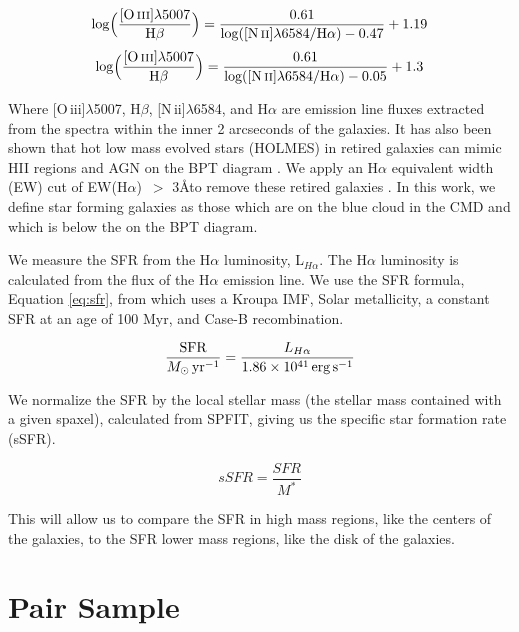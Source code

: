 \documentclass[iop,revtex4,twocolumn,apj,numberedappendix,appendixfloats]{emulateapj}
\newcommand{\OIII}{[O\,{\sc iii}]}
\newcommand{\NII}{[N\,{\sc ii}]}
\newcommand{\angstrom}{\mbox{\normalfont\AA}}
\newcommand{\ewha}{EW(H$\alpha$)}
\begin{document}
\begin{equation}\label{eq:kewley}
\rm{log\Big(\frac{[O\,\textsc{iii}]\lambda 5007}{H\beta}\Big) = \frac{0.61}{log([N\,\textsc{ii}]\lambda 6584 / H\alpha) - 0.47} + 1.19}
\end{equation}
\begin{equation}\label{eq:kauffmann}
\rm{log\Big(\frac{[O\,\textsc{iii}]\lambda 5007}{H\beta}\Big) = \frac{0.61}{log([N\,\textsc{ii}]\lambda 6584 / H\alpha) - 0.05} + 1.3}
\end{equation}

Where \OIII$\lambda$5007, H$\beta$, \NII$\lambda$6584, and H$\alpha$ are emission line fluxes extracted from the spectra within the inner 2 arcseconds of the galaxies. It has also been shown that hot low mass evolved stars (HOLMES) in retired galaxies can mimic HII regions and AGN on the BPT diagram \citep{Stasinska:2008}. We apply an H$\alpha$ equivalent width (EW) cut of \ewha\ $>$ 3\angstrom to remove these retired galaxies \citet{Cid-Fernandes:2011}. In this work, we define star forming galaxies as those which are on the blue cloud in the CMD and which is below the \citet{Kewley:2001} on the BPT diagram.

We measure the SFR from the H$\alpha$ luminosity, L$_{H\alpha}$. The H$\alpha$ luminosity is calculated from the flux of the H$\alpha$ emission line. We use the SFR formula, Equation \ref{eq:sfr}, from \citet{Murphy:2011} which uses a Kroupa IMF, Solar metallicity, a constant SFR at an age of 100 Myr, and Case-B recombination. 

\begin{equation}\label{eq:sfr}
\frac{\rm{SFR}}{M_{\odot} \, \rm{yr^{-1}}} = \frac{L_{H\alpha}}{1.86 \times 10^{41}\, \rm{erg\,s}^{-1}}
\end{equation}

We normalize the SFR by the local stellar mass (the stellar mass contained with a given spaxel), calculated from SPFIT, giving us the specific star formation rate (sSFR). 

\begin{equation}
sSFR = \frac{SFR}{M^*}
\end{equation}

This will allow us to compare the SFR in high mass regions, like the centers of the galaxies, to the SFR lower mass regions, like the disk of the galaxies.

\section{Pair Sample}\label{sec:pair}
\end{document}
